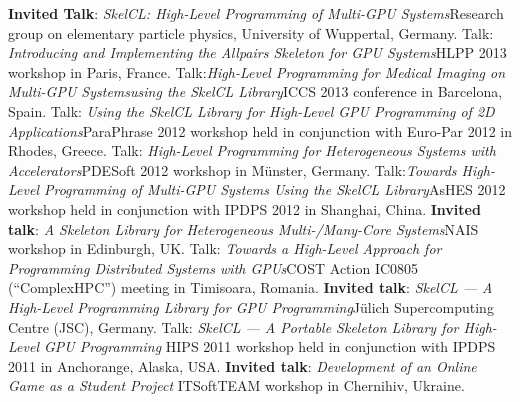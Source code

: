 \documentclass[11pt,a4paper]{moderncv}
\begin{document}
         {\textbf{Invited Talk}: \emph{SkelCL\@: High-Level Programming of Multi-GPU
          Systems}\newline \small Research group on elementary particle physics,
          University of Wuppertal, Germany.}
         {Talk: \emph{Introducing and Implementing the Allpairs Skeleton for GPU
          Systems}\newline \small HLPP 2013 workshop in Paris, France.}
         {Talk:\emph{High-Level Programming for Medical Imaging on Multi-GPU
          Systems\newline using the SkelCL Library}\newline \small ICCS 2013 conference in
          Barcelona, Spain.}
       {Talk: \emph{Using the SkelCL Library for High-Level GPU Programming of
        2D Applications}\newline \small ParaPhrase 2012 workshop held in
        conjunction with Euro-Par 2012 in Rhodes, Greece.}
       {Talk: \emph{High-Level Programming for Heterogeneous Systems with
        Accelerators}\newline \small PDESoft 2012 workshop in Münster, Germany.}
       {Talk:\emph{Towards High-Level Programming of Multi-GPU Systems Using
        the SkelCL Library}\newline \small AsHES 2012 workshop held in
        conjunction with IPDPS 2012 in Shanghai, China.}
       {\textbf{Invited talk}: \emph{A Skeleton Library for Heterogeneous
        Multi-/Many-Core Systems}\newline \small NAIS workshop in Edinburgh, UK.}
       {Talk: \emph{Towards a High-Level Approach for Programming Distributed
        Systems with GPUs}\newline \small COST Action IC0805 (``ComplexHPC'')
        meeting in Timisoara, Romania.}
       {\textbf{Invited talk}: \emph{SkelCL --- A High-Level Programming Library for GPU
        Programming}\newline \small Jülich Supercomputing Centre (JSC), Germany.}
       {Talk: \emph{SkelCL --- A Portable Skeleton Library for High-Level
        GPU Programming}\newline
        \small HIPS 2011 workshop held in conjunction with IPDPS 2011 in
        Anchorange, Alaska, USA.}
       {\textbf{Invited talk}: \emph{Development of an Online Game as a Student Project}\newline
        \small ITSoftTEAM workshop in Chernihiv, Ukraine.}
\end{document}
